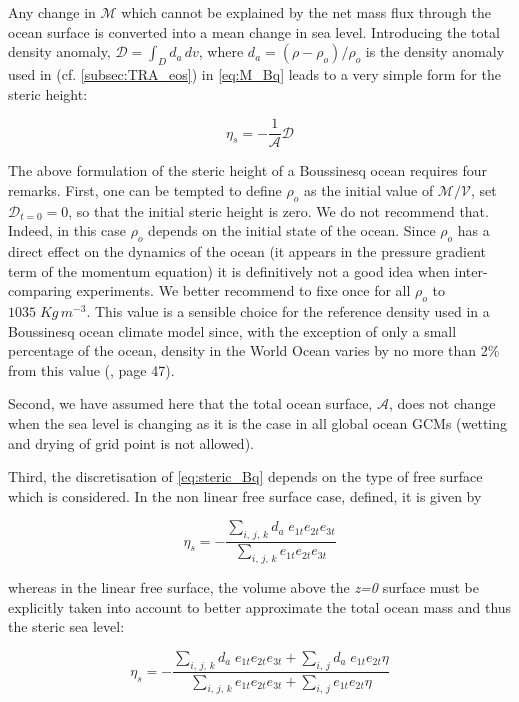\documentclass[../main/NEMO_manual]{subfiles}
\begin{document}
Any change in $\mathcal{M}$ which cannot be explained by the net mass flux through the ocean surface
is converted into a mean change in sea level.
Introducing the total density anomaly, $\mathcal{D}= \int_D d_a \,dv$,
where $d_a = (\rho -\rho_o ) / \rho_o$ is the density anomaly used in \NEMO (cf. \autoref{subsec:TRA_eos})
in \autoref{eq:M_Bq} leads to a very simple form for the steric height:

\begin{equation}
  \eta_s = - \frac{1}{\mathcal{A}} \mathcal{D}
  \label{eq:steric_Bq}
\end{equation}

The above formulation of the steric height of a Boussinesq ocean requires four remarks.
First, one can be tempted to define $\rho_o$ as the initial value of $\mathcal{M}/\mathcal{V}$,
\ie set $\mathcal{D}_{t=0}=0$, so that the initial steric height is zero.
We do not recommend that.
Indeed, in this case $\rho_o$ depends on the initial state of the ocean.
Since $\rho_o$ has a direct effect on the dynamics of the ocean
(it appears in the pressure gradient term of the momentum equation)
it is definitively not a good idea when inter-comparing experiments.
We better recommend to fixe once for all $\rho_o$ to $1035\;Kg\,m^{-3}$.
This value is a sensible choice for the reference density used in a Boussinesq ocean climate model since,
with the exception of only a small percentage of the ocean, density in the World Ocean varies by no more than
2$\%$ from this value (\cite{Gill1982}, page 47).

Second, we have assumed here that the total ocean surface, $\mathcal{A}$,
does not change when the sea level is changing as it is the case in all global ocean GCMs
(wetting and drying of grid point is not allowed).
  
Third, the discretisation of \autoref{eq:steric_Bq} depends on the type of free surface which is considered.
In the non linear free surface case, \ie {} defined, it is given by

\[
  \eta_s = - \frac{ \sum_{i,\,j,\,k} d_a\; e_{1t} e_{2t} e_{3t} }{ \sum_{i,\,j,\,k}       e_{1t} e_{2t} e_{3t} }
\]

whereas in the linear free surface,
the volume above the \textit{z=0} surface must be explicitly taken into account to
better approximate the total ocean mass and thus the steric sea level:

\[
  \eta_s = - \frac{ \sum_{i,\,j,\,k} d_a\; e_{1t}e_{2t}e_{3t} + \sum_{i,\,j} d_a\; e_{1t}e_{2t} \eta }
                  { \sum_{i,\,j,\,k}       e_{1t}e_{2t}e_{3t} + \sum_{i,\,j}       e_{1t}e_{2t} \eta }
\]
\end{document}
